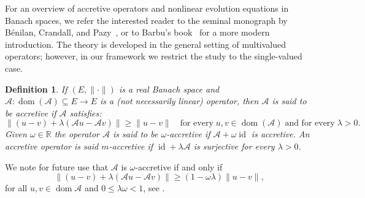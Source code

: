 \documentclass[journal]{article}
\theoremstyle{nonitalic}
\theoremstyle{nonitalic}
\theoremstyle{plain} %
\newtheorem{definition}[theorem]{Definition}
\numberwithin{equation}{section}
\newcommand{\R}{\mathbb{R}}
\newcommand{\dom}{\operatorname{dom}}
\begin{document}
For an overview of accretive operators and nonlinear evolution equations in Banach spaces, we refer the interested reader to the seminal monograph by Bénilan, Crandall, and Pazy~\cite{benilan1988evolution}, or to Barbu's book~\cite{barbu2010nonlinear} for a more modern introduction. The theory is developed in the general setting of multivalued operators; however, in our framework we restrict the study to the single-valued case.
\begin{definition}\label{def: accretivity}
If $(E,\|\cdot\|)$ is a real Banach space and $\mathcal{A}\colon \dom(\mathcal{A})\subseteq E \to E$ is a (not necessarily linear) operator, then $\mathcal{A}$ is said to be \emph{accretive} if $\mathcal{A}$ satisfies:
\begin{equation*}
	\left\|(u - v) + \lambda \left(\mathcal{A}u - \mathcal{A}v\right) \right\|\geq \|u - v\| \quad \mbox{for every}\; u,v \in \dom\left(\mathcal{A}\right)\; \mbox{and for every}\; \lambda >0.
\end{equation*}
Given $\omega\in \R$ the operator $\mathcal A$ is said to be \emph{$\omega$-accretive} if $\mathcal{A} +\omega\operatorname{id}$ is accretive. An accretive operator is said $m$-accretive if $\operatorname{id} + \lambda\mathcal{A}$  is surjective for every $\lambda >0$.
\end{definition}

We note for future use that $\mathcal{A}$ is $\omega$-accretive if and only if 
\begin{equation}
\label{eq:omega-accretivity-1}
\|(u-v)+\lambda (\mathcal{A}u-\mathcal{A}v)\|\geq
(1-\omega \lambda)\|u-v\|,
\end{equation}
for all $u,v\in \dom\mathcal{A}$ and $0\leq\lambda\omega<1
$, see  \cite[Section 2.1]{benilan1988evolution}.
\end{document}
